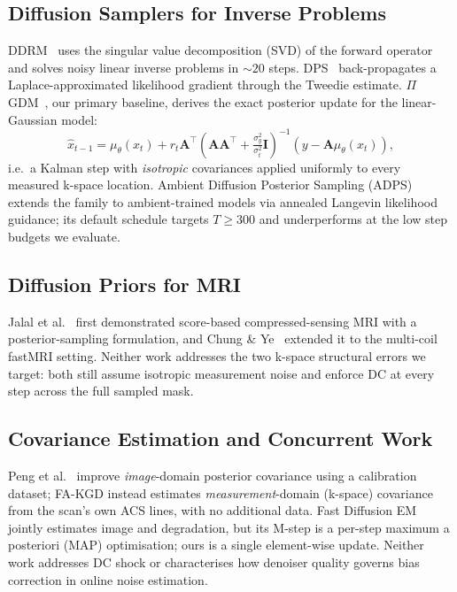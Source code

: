 \documentclass[10pt,twocolumn,letterpaper]{article}
\newcommand{\muth}{\mu_\theta}
\begin{document}
\subsection{Diffusion Samplers for Inverse Problems}

DDRM~\cite{kawar2022ddrm} uses the singular value decomposition (SVD) of
the forward operator and solves noisy linear inverse problems in ${\sim}20$
steps. DPS~\cite{chung2023dps} back-propagates a Laplace-approximated
likelihood gradient through the Tweedie estimate. $\Pi$GDM~\cite{song2023pigdm},
our primary baseline, derives the exact posterior update for the
linear-Gaussian model:
\begin{equation}
  \hat{x}_{t-1} = \muth(x_t) + r_t \mathbf{A}^\top
  \!\left(\mathbf{A}\mathbf{A}^\top + \tfrac{\sigma_y^2}{\sigma_t^2}
  \mathbf{I}\right)^{-1}\!\!(y - \mathbf{A}\muth(x_t)),
  \label{eq:pigdm}
\end{equation}
i.e.\ a Kalman step with \emph{isotropic} covariances applied uniformly to
every measured k-space location. Ambient Diffusion Posterior Sampling
(ADPS)~\cite{daras2025ambient} extends the family to ambient-trained models
via annealed Langevin likelihood guidance; its default schedule targets
$T\!\geq\!300$ and underperforms at the low step budgets we evaluate.

\subsection{Diffusion Priors for MRI}

Jalal et al.~\cite{jalal2021robust} first demonstrated score-based
compressed-sensing MRI with a posterior-sampling formulation, and Chung \&
Ye~\cite{chung2022scoremri} extended it to the multi-coil fastMRI setting.
Neither work addresses the two k-space structural errors we target: both
still assume isotropic measurement noise and enforce DC at every step across
the full sampled mask.

\subsection{Covariance Estimation and Concurrent Work}

Peng et al.~\cite{peng2024optimal} improve \emph{image}-domain posterior
covariance using a calibration dataset; FA-KGD instead estimates
\emph{measurement}-domain (k-space) covariance from the scan's own ACS lines,
with no additional data. Fast Diffusion EM~\cite{laroche2024fastdiffem}
jointly estimates image and degradation, but its M-step is a per-step
maximum a posteriori (MAP) optimisation; ours is a single element-wise
update. Neither work addresses
DC shock or characterises how denoiser quality governs bias correction in
online noise estimation.
\end{document}
